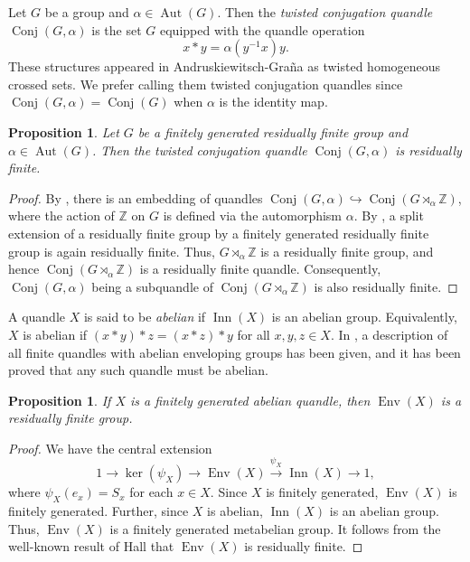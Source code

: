\documentclass[12pt]{amsart}
\newtheorem{prop}[theorem]{Proposition}
\theoremstyle{definition}
\numberwithin{equation}{subsection}
\newcommand{\Env}{\operatorname{Env}}
\newcommand{\Aut}{\operatorname{Aut}}
\newcommand{\Conj}{\operatorname{Conj}}
\newcommand{\Inn}{\operatorname{Inn}}
\begin{document}
Let $G$ be a group and $\alpha \in \Aut(G)$. Then the {\it twisted conjugation quandle} $\Conj(G,\alpha)$ is the set $G$ equipped with the quandle operation $$x*y=\alpha(y^{-1} x)y.$$ These structures appeared in Andruskiewitsch-Gra\~{n}a \cite[Section 1.3.7]{MR1994219} as twisted homogeneous crossed sets. We prefer calling them twisted conjugation quandles since $\Conj(G,\alpha) = \Conj(G)$ when $\alpha$ is the identity map.


\begin{prop}
Let $G$ be a finitely generated residually finite group and $\alpha \in \Aut(G)$. Then the twisted conjugation quandle $\Conj(G,\alpha)$ is residually finite.
\end{prop}

\begin{proof}
By \cite{MR4564617}, there is an embedding of quandles $\Conj(G, \alpha)\hookrightarrow \Conj(G \rtimes_\alpha \mathbb{Z})$, where the action of $\mathbb{Z}$ on $G$ is defined via the automorphism $\alpha$. By \cite[Theorem 7, p.29]{MR0310044}, a split extension of a residually finite group by a  finitely generated residually finite group is again residually finite. Thus, $G \rtimes_{\alpha} \mathbb{Z}$ is a residually finite group, and hence $\Conj(G \rtimes_{\alpha} \mathbb{Z})$ is a residually finite quandle. 
Consequently, $\Conj(G,\alpha)$ being a subquandle of  $\Conj(G \rtimes_{\alpha} \mathbb{Z})$ is also residually finite. 
\end{proof}

A quandle $X$ is said to be {\it abelian} if $\Inn(X)$ is an abelian group. Equivalently, $X$ is abelian if $(x*y)*z=(x*z)*y$ for all $x, y, z \in X$.  In \cite{MR4116819}, a description of all finite quandles with abelian enveloping groups has been given, and it has been proved that any such quandle must be abelian.


\begin{prop} \label{Env(X) rf for abelian}
If $X$ is a finitely generated abelian quandle, then $\Env(X)$ is a residually finite group.
\end{prop}
\begin{proof}
We have the central extension
		$$1 \rightarrow \ker(\psi_X) \rightarrow \Env(X) \xrightarrow{\psi_X} \Inn(X) \rightarrow 1,$$
where $\psi_X(e_x)=S_x$ for each $x \in X$. Since $X$ is finitely generated, $\Env(X)$ is finitely generated. Further, since $X$ is abelian, $\Inn(X)$ is an abelian group. Thus, $\Env(X)$ is a finitely generated metabelian group. It follows from the well-known result of Hall \cite[Theorem 1]{MR0110750} that $\Env(X)$ is residually finite.
\end{proof}
\end{document}
